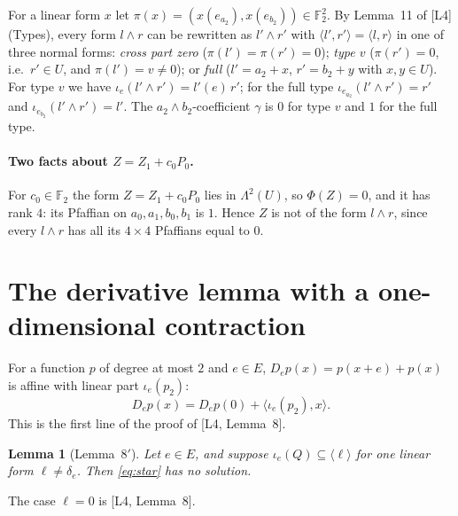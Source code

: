 \documentclass[11pt,a4paper]{article}
\theoremstyle{plain}
\newtheorem{lemma}[theorem]{Lemma}
\theoremstyle{definition}
\theoremstyle{remark}
\newcommand{\F}{\mathbb{F}_2}
\newcommand{\Lam}{\Lambda^{2}}
\newcommand{\Dir}{E}
\begin{document}
For a linear form $x$ let $\pi(x)=(x(e_{a_2}),x(e_{b_2}))\in\F^2$. By Lemma~11 of [L4] (Types), every form $l\wedge r$ can be rewritten as $l'\wedge r'$ with $\langle l',r'\rangle=\langle l,r\rangle$ in one of three normal forms: \emph{cross part zero} ($\pi(l')=\pi(r')=0$); \emph{type $v$} ($\pi(r')=0$, i.e.\ $r'\in U$, and $\pi(l')=v\ne0$); or \emph{full} ($l'=a_2+x$, $r'=b_2+y$ with $x,y\in U$). For type $v$ we have $\iota_e(l'\wedge r')=l'(e)\,r'$; for the full type $\iota_{e_{a_2}}(l'\wedge r')=r'$ and $\iota_{e_{b_2}}(l'\wedge r')=l'$. The $a_2\wedge b_2$-coefficient $\gamma$ is $0$ for type $v$ and $1$ for the full type.

\paragraph{Two facts about $Z=Z_1+c_0P_0$.} For $c_0\in\F$ the form $Z=Z_1+c_0P_0$ lies in $\Lam(U)$, so $\Phi(Z)=0$, and it has rank $4$: its Pfaffian on $a_0,a_1,b_0,b_1$ is $1$. Hence $Z$ is not of the form $l\wedge r$, since every $l\wedge r$ has all its $4\times4$ Pfaffians equal to $0$.

\section{The derivative lemma with a one-dimensional contraction}

For a function $p$ of degree at most $2$ and $e\in\Dir$, $D_ep(x)=p(x+e)+p(x)$ is affine with linear part $\iota_e(p_2)$:
\begin{equation}\label{eq:bridge}
  D_ep(x)=D_ep(0)+\langle\iota_e(p_2),x\rangle .
\end{equation}
This is the first line of the proof of [L4, Lemma~8].

\begin{lemma}[Lemma~8$'$]\label{lem:8p}
Let $e\in\Dir$, and suppose $\iota_e(Q)\subseteq\langle\ell\rangle$ for one linear form $\ell\ne\delta_e$. Then \eqref{eq:star} has no solution.
\end{lemma}

The case $\ell=0$ is [L4, Lemma~8].
\end{document}
